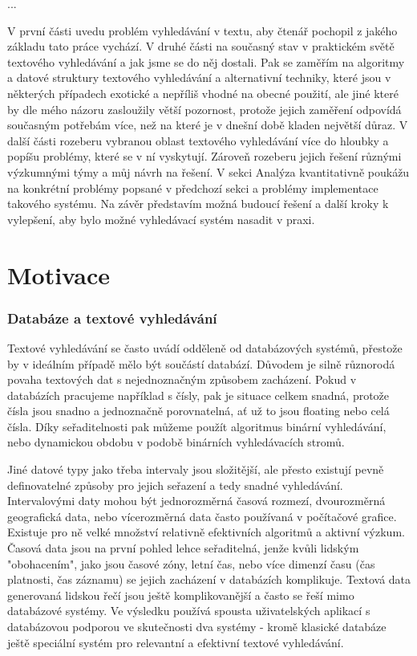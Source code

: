 \documentclass[11pt,letterpaper,oneside,openright]{book}
\begin{document}
...

V první části uvedu problém vyhledávání v textu, aby čtenář pochopil z jakého
základu tato práce vychází. V druhé části na současný stav v praktickém světě
textového vyhledávání a jak jsme se do něj dostali. Pak se zaměřím na algoritmy
a datové struktury textového vyhledávání a alternativní techniky, které jsou v
některých případech exotické a nepříliš vhodné na obecné použití, ale jiné
které by dle mého názoru zasloužily větší pozornost, protože jejich zaměření
odpovídá současným potřebám více, než na které je v dnešní době kladen největší
důraz. V další části rozeberu vybranou oblast textového vyhledávání více do
hloubky a popíšu problémy, které se v ní vyskytují. Zároveň rozeberu jejich
řešení různými výzkumnými týmy a můj návrh na řešení. V sekci Analýza
kvantitativně poukážu na konkrétní problémy popsané v předchozí sekci a
problémy implementace takového systému. Na závěr představím možná budoucí
řešení a další kroky k vylepšení, aby bylo možné vyhledávací systém nasadit v
praxi.

\chapter{Motivace}

\subsection{Databáze a textové vyhledávání}
Textové vyhledávání se často uvádí odděleně od databázových systémů, přestože
by v ideálním případě mělo být součástí databází. Důvodem je silně různorodá
povaha textových dat s nejednoznačným způsobem zacházení. Pokud v databázích
pracujeme například s čísly, pak je situace celkem snadná, protože čísla jsou
snadno a jednoznačně porovnatelná, ať už to jsou floating nebo celá čísla. Díky
seřaditelnosti pak můžeme použít algoritmus binární vyhledávání, nebo
dynamickou obdobu v podobě binárních vyhledávacích stromů.

Jiné datové typy jako třeba intervaly jsou složitější, ale přesto existují
pevně definovatelné způsoby pro jejich seřazení a tedy snadné vyhledávání.
Intervalovými daty mohou být jednorozměrná časová rozmezí, dvourozměrná
geografická data, nebo vícerozměrná data často používaná v počítačové grafice.
Existuje pro ně velké množství relativně efektivních algoritmů a aktivní
výzkum. Časová data jsou na první pohled lehce seřaditelná, jenže kvůli lidským
"obohacením", jako jsou časové zóny, letní čas, nebo více dimenzí času (čas
platnosti, čas záznamu) se jejich zacházení v databázích komplikuje. Textová
data generovaná lidskou řečí jsou ještě komplikovanější a často se řeší mimo
databázové systémy. Ve výsledku používá spousta uživatelských aplikací s
databázovou podporou ve skutečnosti dva systémy - kromě klasické databáze ještě
speciální systém pro relevantní a efektivní textové vyhledávání.
\end{document}
